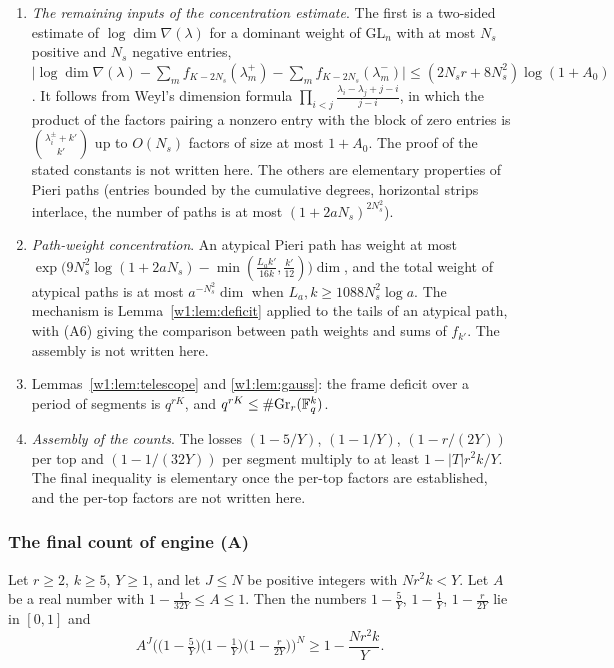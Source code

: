 \begin{enumerate}[label=(A\arabic*),start=6,leftmargin=*]
\item \emph{The remaining inputs of the concentration estimate}. The first is a two-sided estimate of $\log\dim\nabla(\lambda)$ for a dominant weight of $\mathrm{GL}_n$ with at most $N_s$ positive and $N_s$ negative entries, $\lvert\log\dim\nabla(\lambda)-\sum_mf_{K-2N_s}(\lambda_m^+)-\sum_mf_{K-2N_s}(\lambda_m^-)\rvert\le(2N_sr+8N_s^2)\log(1+A_0)$. It follows from Weyl's dimension formula $\prod_{i<j}\frac{\lambda_i-\lambda_j+j-i}{j-i}$, in which the product of the factors pairing a nonzero entry with the block of zero entries is $\binom{\lambda_i^\pm+k'}{k'}$ up to $O(N_s)$ factors of size at most $1+A_0$. The proof of the stated constants is not written here. The others are elementary properties of Pieri paths (entries bounded by the cumulative degrees, horizontal strips interlace, the number of paths is at most $(1+2aN_s)^{2N_s^2}$).
\item \emph{Path-weight concentration}. An atypical Pieri path has weight at most $\exp\big(9N_s^2\log(1+2aN_s)-\min(\frac{L_ak'}{16k},\frac{k'}{12})\big)\dim$, and the total weight of atypical paths is at most $a^{-N_s^2}\dim$ when $L_a,k\ge1088N_s^2\log a$. The mechanism is Lemma~\ref{w1:lem:deficit} applied to the tails of an atypical path, with (A6) giving the comparison between path weights and sums of $f_{k'}$. The assembly is not written here.
\item[(A8)] Lemmas~\ref{w1:lem:telescope} and \ref{w1:lem:gauss}: the frame deficit over a period of segments is $q^{rK}$, and $q^{rK}\le\#\mathrm{Gr}_r(\mathbb F_q^k)$.
\item[(A9)] \emph{Assembly of the counts}. The losses $(1-5/Y)$, $(1-1/Y)$, $(1-r/(2Y))$ per top and $(1-1/(32Y))$ per segment multiply to at least $1-\lvert T\rvert r^2k/Y$. The final inequality is elementary once the per-top factors are established, and the per-top factors are not written here.
\end{enumerate}


\subsubsection{The final count of engine (A)}\label{w1:sec:A9final}

\begin{lemma}\label{w1:lem:A9}
Let $r\ge2$, $k\ge5$, $Y\ge1$, and let $J\le N$ be positive integers with $Nr^2k<Y$. Let $A$ be a real number with $1-\frac1{32Y}\le A\le1$. Then the numbers $1-\frac5Y$, $1-\frac1Y$, $1-\frac r{2Y}$ lie in $[0,1]$ and
\[
A^J\Big(\big(1-\tfrac5Y\big)\big(1-\tfrac1Y\big)\big(1-\tfrac r{2Y}\big)\Big)^N\ge1-\frac{Nr^2k}Y .
\]
\end{lemma}

